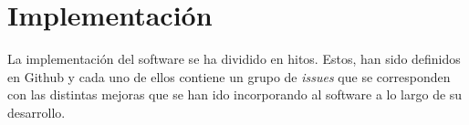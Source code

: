\chapter{Implementación}

La implementación del software se ha dividido en hitos. Estos, han sido definidos en Github
y cada uno de ellos contiene un grupo de \textit{issues} que se corresponden con las distintas
mejoras que se han ido incorporando al software a lo largo de su desarrollo.

